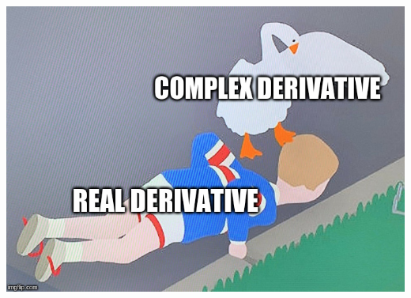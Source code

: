 \documentclass{beamer}
\begin{document}
\begin{frame}{}
\includegraphics[width=\textwidth,height=0.8\textheight,keepaspectratio]{GooseDerivative.jpg}
\end{frame}
\end{document}
